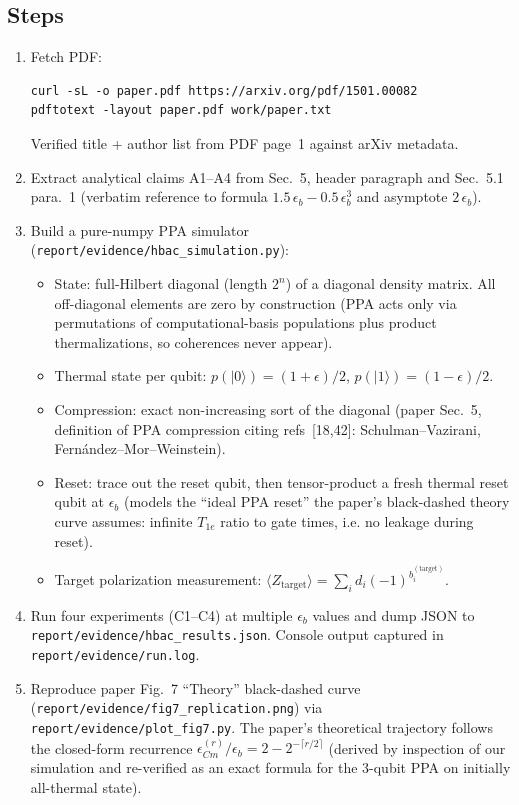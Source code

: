 \documentclass[11pt]{article}
\begin{document}
\subsection*{Steps}
\begin{enumerate}
  \item Fetch PDF:
    \begin{lstlisting}
curl -sL -o paper.pdf https://arxiv.org/pdf/1501.00082
pdftotext -layout paper.pdf work/paper.txt
    \end{lstlisting}
    Verified title + author list from PDF page~1 against arXiv metadata.
  \item Extract analytical claims A1--A4 from Sec.~5, header paragraph and
    Sec.~5.1 para.~1 (verbatim reference to formula
    $1.5\,\epsilon_b - 0.5\,\epsilon_b^{3}$ and asymptote $2\,\epsilon_b$).
  \item Build a pure-numpy PPA simulator (\texttt{report/evidence/hbac\_simulation.py}):
    \begin{itemize}
      \item State: full-Hilbert diagonal (length $2^n$) of a diagonal density
        matrix. All off-diagonal elements are zero by construction (PPA acts
        only via permutations of computational-basis populations plus product
        thermalizations, so coherences never appear).
      \item Thermal state per qubit: $p(|0\rangle)=(1+\epsilon)/2$,
        $p(|1\rangle)=(1-\epsilon)/2$.
      \item Compression: exact non-increasing sort of the diagonal (paper
        Sec.~5, definition of PPA compression citing refs~[18,42]:
        Schulman--Vazirani, Fern\'andez--Mor--Weinstein).
      \item Reset: trace out the reset qubit, then tensor-product a fresh
        thermal reset qubit at $\epsilon_b$ (models the ``ideal PPA reset''
        the paper's black-dashed theory curve assumes: infinite $T_{1e}$ ratio
        to gate times, i.e. no leakage during reset).
      \item Target polarization measurement:
        $\langle Z_{\text{target}}\rangle
         = \sum_i d_i (-1)^{b_i^{(\text{target})}}$.
    \end{itemize}
  \item Run four experiments (C1--C4) at multiple $\epsilon_b$ values and
    dump JSON to \texttt{report/evidence/hbac\_results.json}. Console output
    captured in \texttt{report/evidence/run.log}.
  \item Reproduce paper Fig.~7 ``Theory'' black-dashed curve
    (\texttt{report/evidence/fig7\_replication.png}) via
    \texttt{report/evidence/plot\_fig7.py}. The paper's theoretical trajectory
    follows the closed-form recurrence
    $\epsilon_{Cm}^{(r)}/\epsilon_b = 2 - 2^{-\lceil r/2 \rceil}$
    (derived by inspection of our simulation and re-verified as an exact
    formula for the 3-qubit PPA on initially all-thermal state).
\end{enumerate}
\end{document}
